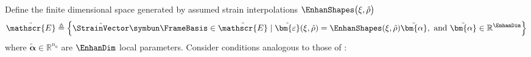 Define the finite dimensional space generated by assumed strain interpolations \(\EnhanShapes\bigl(\xi,\hat{\rho}\bigr)\)
\begin{equation*}
\tilde{\mathscr{E}}
\triangleq 
\left\{
\tilde{\StrainVector} \symbun \FrameBasis \in \tilde{\mathscr{E}} \mid %
\tilde{\bm{\varepsilon}}(\xi,\hat{\rho})=\EnhanShapes(\xi, \hat{\rho}) \tilde{\bm{\alpha}}, \text { and } \tilde{\bm{\alpha}} \in \mathbb{R}^{\EnhanDim}\right\}
\label{eq:SR16}
\end{equation*}
where $\tilde{\bm{\alpha}} \in \mathbb{R}^{n_a}$ are $\EnhanDim$ local parameters. %
%
Consider conditions analogous to those of \cite{simo1992geometrically}:
